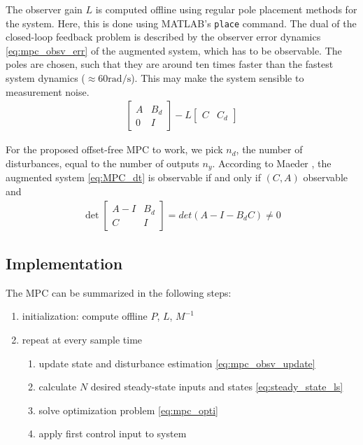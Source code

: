 The observer gain $L$ is computed offline using regular pole placement methods for the system. Here, this is done using MATLAB's \texttt{place} command. The dual of the closed-loop feedback problem is described by the observer error dynamics \ref{eq:mpc_obsv_err} of the augmented system, which has to be observable. The poles are chosen, such that they are around ten times faster than the fastest system dynamics ($\approx 60\si{\radian\per\second}$). This may make the system sensible to measurement noise. 
\begin{align}
\begin{bmatrix}
A & B_d \\
0 & I
\end{bmatrix}
- L
\begin{bmatrix}
C & C_d
\end{bmatrix} \label{eq:mpc_obsv_err}
\end{align}

For the proposed offset-free MPC to work, we pick $n_d$, the number of disturbances, equal to the number of outputs $n_y$. According to Maeder \cite{Maeder2009}, the augmented system \ref{eq:MPC_dt} is observable if and only if $(C,A)$ observable and
\begin{align}
\det \begin{bmatrix}
A-I & B_d \\ C & I 
\end{bmatrix} = det(A-I-B_dC) \neq 0 \label{eq:mpc_obsv_cond}
\end{align}

\subsection{Implementation}
The MPC can be summarized in the following steps:
\begin{enumerate}
\item initialization: compute offline $P$, $L$, $M^{-1}$
\item repeat at every sample time
\begin{enumerate}
\item update state and disturbance estimation \ref{eq:mpc_obsv_update} \label{enum:mpc_start}
\item calculate $N$ desired steady-state inputs and states \ref{eq:steady_state_ls}
\item solve optimization problem \ref{eq:mpc_opti}
\item apply first control input to system \label{enum:mpc_finish}
\end{enumerate}
\end{enumerate}

